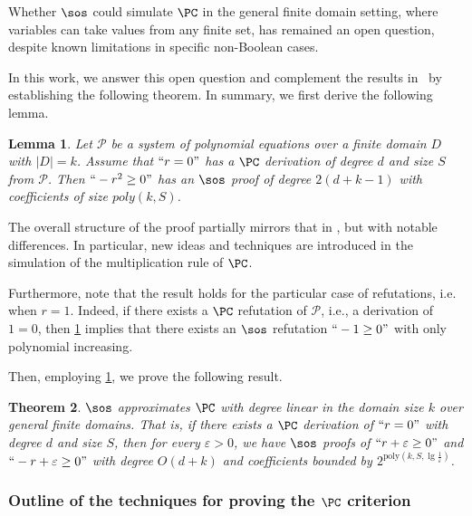 \documentclass[11pt]{article}
\newtheorem{theorem}{Theorem}[section]
\newtheorem{lemma}[theorem]{Lemma}
\begin{document}
Whether $\sos$ could simulate $\PC$ in the general finite domain setting, where variables can take values from any finite set, has remained an open question, despite known limitations in specific non-Boolean cases. 

In this work, we answer this open question and complement the results in~\cite{GrigorievV01,berkholz18} by establishing the following theorem. In summary, we first derive the following lemma.

\begin{lemma}\label{th:sos_sim_PC_introduction}
    Let $\mathcal{P}$ be a system of polynomial equations over a finite domain $D$ with $|D| = k$. Assume that $``r=0"$ has a $\PC$ derivation of degree $d$ and size $S$ from $\mathcal{P}$. Then $`` -r^2\geq 0"$ has an $\sos$ proof of degree $2(d+k-1)$ with coefficients of size $poly(k,S)$.
\end{lemma}

The overall structure of the proof partially mirrors that in \cite{berkholz18}, but with notable differences. In particular, new ideas and techniques are introduced in the simulation of the multiplication rule of \(\PC\).

Furthermore, note that the result holds for the particular case of refutations, i.e. when $r=1$. Indeed, if there exists a $\PC$ refutation of $\mathcal{P}$, i.e., a derivation of $1=0$, then \cref{th:sos_sim_PC_introduction} implies that there exists an $\sos$ refutation $``-1 \geq 0"$ with only polynomial increasing.

Then, employing \cref{th:sos_sim_PC_introduction}, we prove the following result.

\begin{theorem}\label{th:sospc_introduction}
    $\sos$ \emph{approximates} $\PC$ with degree linear in the domain size $k$ over general finite domains. That is, if there exists a \(\PC\) derivation of \( ``r=0" \) with degree \( d \) and size \( S \), then for every \( \varepsilon > 0 \), we have \(\sos\) proofs of \( ``r+\varepsilon \geq 0" \) and \( ``-r+\varepsilon \geq 0" \) with degree \( O(d+k) \) and coefficients bounded by \( 2^{\text{poly}(k, S, \lg \frac{1}{\varepsilon})} \).
\end{theorem}


\subsubsection*{Outline of the techniques for proving the $\PC$ criterion}\label{sect:outline_PC_proof}
\end{document}
